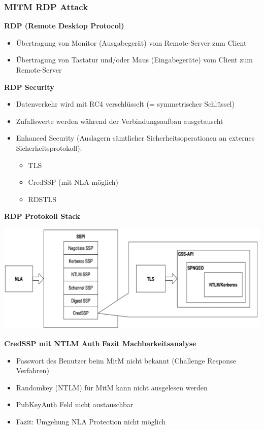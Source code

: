 \subsubsection{MITM RDP Attack}
\textbf{RDP (Remote Desktop Protocol)}
\begin{itemize}
    \item Übertragung von Monitor (Ausgabegerät) vom Remote-Server zum Client
    \item Übertragung von Tastatur und/oder Maus (Eingabegeräte) vom Client zum Remote-Server
\end{itemize}
\textbf{RDP Security}
\begin{itemize}
    \item Datenverkehr wird mit RC4 verschlüsselt (= symmetrischer Schlüssel)
    \item Zufallswerte werden während der Verbindungsaufbau ausgetauscht
    \item Enhanced Security (Auslagern sämtlicher Sicherheitsoperationen an externes Sicherheitsprotokoll):
    \begin{itemize}
        \item TLS
        \item CredSSP (mit NLA möglich)
        \item RDSTLS
    \end{itemize}
\end{itemize}
\textbf{RDP Protokoll Stack}
\begin{center}
    \vspace{-8pt}
    \includegraphics[width=1.0\linewidth]{./img/09-mitm/rdp_proto}
    \vspace{-8pt}
\end{center}
\textbf{CredSSP mit NTLM Auth}
\textbf{Fazit Machbarkeitsanalyse}
\begin{itemize}
    \item Passwort des Benutzer beim MitM nicht bekannt (Challenge Response Verfahren)
    \item Randomkey (NTLM) für MitM kann nicht ausgelesen werden
    \item PubKeyAuth Feld nicht austauschbar
    \item Fazit: Umgehung NLA Protection nicht möglich
\end{itemize}
